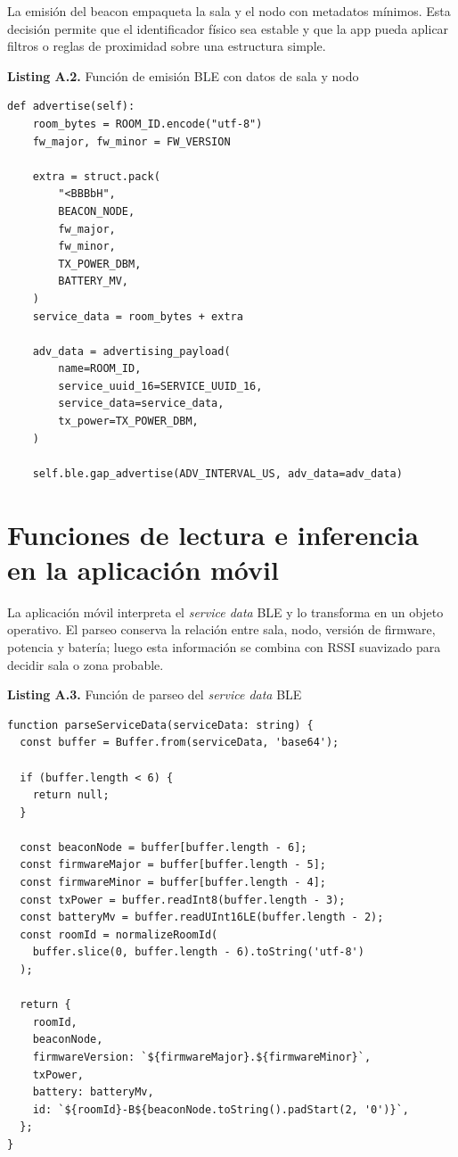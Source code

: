 La emisión del beacon empaqueta la sala y el nodo con metadatos mínimos. Esta decisión permite que el identificador físico sea estable y que la app pueda aplicar filtros o reglas de proximidad sobre una estructura simple.

\begin{center}
\textbf{Listing A.2.} Función de emisión BLE con datos de sala y nodo
\end{center}

\begin{lstlisting}[style=pythoncode]
def advertise(self):
    room_bytes = ROOM_ID.encode("utf-8")
    fw_major, fw_minor = FW_VERSION

    extra = struct.pack(
        "<BBBbH",
        BEACON_NODE,
        fw_major,
        fw_minor,
        TX_POWER_DBM,
        BATTERY_MV,
    )
    service_data = room_bytes + extra

    adv_data = advertising_payload(
        name=ROOM_ID,
        service_uuid_16=SERVICE_UUID_16,
        service_data=service_data,
        tx_power=TX_POWER_DBM,
    )

    self.ble.gap_advertise(ADV_INTERVAL_US, adv_data=adv_data)
\end{lstlisting}

\section{Funciones de lectura e inferencia en la aplicación móvil}

La aplicación móvil interpreta el \textit{service data} BLE y lo transforma en un objeto operativo. El parseo conserva la relación entre sala, nodo, versión de firmware, potencia y batería; luego esta información se combina con RSSI suavizado para decidir sala o zona probable.

\begin{center}
\textbf{Listing A.3.} Función de parseo del \textit{service data} BLE
\end{center}

\begin{lstlisting}[style=typescriptcode]
function parseServiceData(serviceData: string) {
  const buffer = Buffer.from(serviceData, 'base64');

  if (buffer.length < 6) {
    return null;
  }

  const beaconNode = buffer[buffer.length - 6];
  const firmwareMajor = buffer[buffer.length - 5];
  const firmwareMinor = buffer[buffer.length - 4];
  const txPower = buffer.readInt8(buffer.length - 3);
  const batteryMv = buffer.readUInt16LE(buffer.length - 2);
  const roomId = normalizeRoomId(
    buffer.slice(0, buffer.length - 6).toString('utf-8')
  );

  return {
    roomId,
    beaconNode,
    firmwareVersion: `${firmwareMajor}.${firmwareMinor}`,
    txPower,
    battery: batteryMv,
    id: `${roomId}-B${beaconNode.toString().padStart(2, '0')}`,
  };
}
\end{lstlisting}

